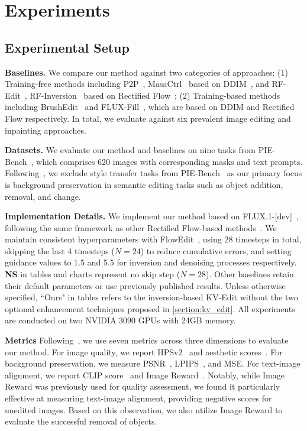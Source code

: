 \section{Experiments}
\label{sec:experiments}


\subsection{Experimental Setup}

\noindent\textbf{Baselines.} We compare our method against two categories of approaches: (1) Training-free methods including P2P~\cite{hertz2022prompt}, MasaCtrl~\cite{cao2023masactrl} based on DDIM~\cite{ddim}, and RF-Edit~\cite{wang2024taming}, RF-Inversion~\cite{rout2024semantic} based on Rectified Flow~\cite{rectflow}; (2) Training-based methods including BrushEdit~\cite{li2024brushedit} and FLUX-Fill~\cite{flux}, which are based on DDIM and Rectified Flow respectively. In total, we evaluate against six prevalent image editing and inpainting approaches.

\noindent\textbf{Datasets.} We evaluate our method and baselines on nine tasks from PIE-Bench~\cite{ju2024pnp}, which comprises 620 images with corresponding masks and text prompts. Following~\cite{xu2024inversion,li2024brushedit}, we exclude style transfer tasks from PIE-Bench~\cite{ju2024pnp} as our primary focus is background preservation in semantic editing tasks such as object addition, removal, and change.

\noindent\textbf{Implementation Details.} We implement our method based on FLUX.1-[dev]~\cite{flux}, following the same framework as other Rectified Flow-based methods~\cite{wang2024taming,rout2024semantic,kulikov2024flowedit}. We maintain consistent hyperparameters with FlowEdit~\cite{kulikov2024flowedit}, using 28 timesteps in total, skipping the last 4 timesteps ($N=24$) to reduce cumulative errors, and setting guidance values to 1.5 and 5.5 for inversion and denoising processes respectively.
\textbf{NS} in tables and charts represent no skip step ($N=28$). Other baselines retain their default parameters or use previously published results. Unless otherwise specified, ``Ours" in tables refers to the inversion-based KV-Edit without the two optional enhancement techniques proposed in \cref{section:kv_edit}. All experiments are conducted on two NVIDIA 3090 GPUs with 24GB memory.

\noindent\textbf{Metrics} Following~\cite{ju2024brushnet,li2024brushedit,ju2024pnp}, we use seven metrics across three dimensions to evaluate our method. For image quality, we report HPSv2~\cite{zhang2018unreasonable} and aesthetic scores~\cite{schuhmann2022laion}. For background preservation, we measure PSNR~\cite{huynh2008scope}, LPIPS~\cite{zhang2018unreasonable}, and MSE. For text-image alignment, we report CLIP score~\cite{radford2021learning} and Image Reward~\cite{xu2023imagereward}. Notably, while Image Reward was previously used for quality assessment, we found it particularly effective at measuring text-image alignment, providing negative scores for unedited images. Based on this observation, we also utilize Image Reward to evaluate the successful removal of objects.

